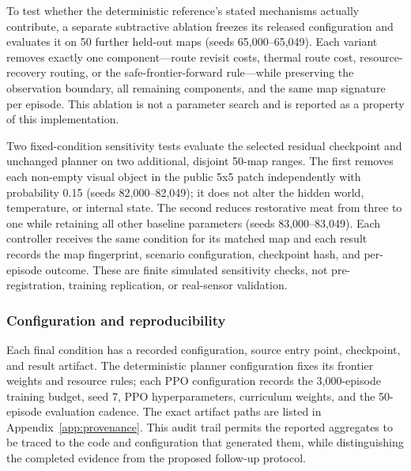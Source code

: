 \documentclass[10pt,letterpaper]{article}
\begin{document}
To test whether the deterministic reference's stated mechanisms actually contribute, a separate subtractive ablation freezes its released configuration and evaluates it on 50 further held-out maps (seeds 65,000--65,049). Each variant removes exactly one component---route revisit costs, thermal route cost, resource-recovery routing, or the safe-frontier-forward rule---while preserving the observation boundary, all remaining components, and the same map signature per episode. This ablation is not a parameter search and is reported as a property of this implementation.

Two fixed-condition sensitivity tests evaluate the selected residual checkpoint and unchanged planner on two additional, disjoint 50-map ranges. The first removes each non-empty visual object in the public 5x5 patch independently with probability 0.15 (seeds 82,000--82,049); it does not alter the hidden world, temperature, or internal state. The second reduces restorative meat from three to one while retaining all other baseline parameters (seeds 83,000--83,049). Each controller receives the same condition for its matched map and each result records the map fingerprint, scenario configuration, checkpoint hash, and per-episode outcome. These are finite simulated sensitivity checks, not pre-registration, training replication, or real-sensor validation.

\subsubsection{Configuration and reproducibility}

Each final condition has a recorded configuration, source entry point, checkpoint, and result artifact. The deterministic planner configuration fixes its frontier weights and resource rules; each PPO configuration records the 3,000-episode training budget, seed 7, PPO hyperparameters, curriculum weights, and the 50-episode evaluation cadence. The exact artifact paths are listed in Appendix~\ref{app:provenance}. This audit trail permits the reported aggregates to be traced to the code and configuration that generated them, while distinguishing the completed evidence from the proposed follow-up protocol.
\end{document}
